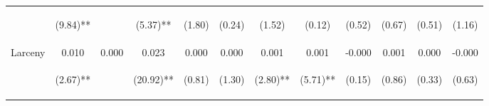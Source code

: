 \begin{tabular}{lccccccccccc}
 & \begin{footnotesize}(9.84)**\end{footnotesize} & \begin{footnotesize}\end{footnotesize} & \begin{footnotesize}(5.37)**\end{footnotesize} & \begin{footnotesize}(1.80)\end{footnotesize} & \begin{footnotesize}(0.24)\end{footnotesize} & \begin{footnotesize}(1.52)\end{footnotesize} & \begin{footnotesize}(0.12)\end{footnotesize} & \begin{footnotesize}(0.52)\end{footnotesize} & \begin{footnotesize}(0.67)\end{footnotesize} & \begin{footnotesize}(0.51)\end{footnotesize} & \begin{footnotesize}(1.16)\end{footnotesize}\\
\noalign{\smallskip}Larceny & 0.010 & 0.000 & 0.023 & 0.000 & 0.000 & 0.001 & 0.001 & -0.000 & 0.001 & 0.000 & -0.000\\
 & \begin{footnotesize}(2.67)**\end{footnotesize} & \begin{footnotesize}\end{footnotesize} & \begin{footnotesize}(20.92)**\end{footnotesize} & \begin{footnotesize}(0.81)\end{footnotesize} & \begin{footnotesize}(1.30)\end{footnotesize} & \begin{footnotesize}(2.80)**\end{footnotesize} & \begin{footnotesize}(5.71)**\end{footnotesize} & \begin{footnotesize}(0.15)\end{footnotesize} & \begin{footnotesize}(0.86)\end{footnotesize} & \begin{footnotesize}(0.33)\end{footnotesize} & \begin{footnotesize}(0.63)\end{footnotesize}\\

\end{tabular}

